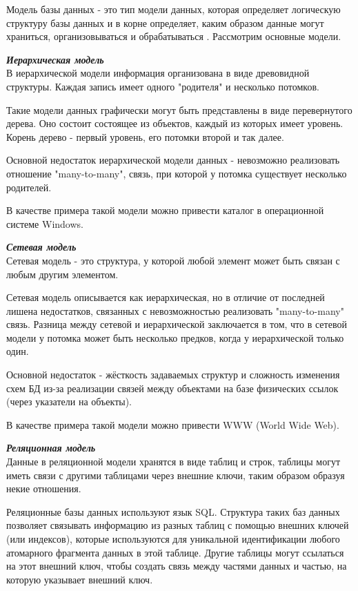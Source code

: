 Модель базы данных - это тип модели данных, которая определяет логическую структуру базы данных и в корне определяет, каким образом данные могут храниться, организовываться и обрабатываться \cite{db-model}.
Рассмотрим основные модели.  

\textbf{\textit{Иерархическая модель}}\\
В иерархической модели информация организована в виде древовидной структуры.  
Каждая запись имеет одного "родителя" и несколько потомков. 

Такие модели данных графически могут быть представлены в виде перевернутого дерева.  
Оно состоит состоящее из объектов, каждый из которых имеет уровень. Корень дерево - первый уровень, его потомки второй и так далее.

Основной недостаток иерархической модели данных - невозможно реализовать отношение "many-to-many", связь, при которой у потомка существует несколько родителей.  

В качестве примера такой модели можно привести каталог в операционной системе Windows.  

\textbf{\textit{Сетевая модель}}\\
Сетевая модель - это структура, у которой любой элемент может быть связан с любым другим элементом.  

Сетевая модель описывается как иерархическая, но в отличие от последней лишена недостатков, связанных с невозможностью реализовать "many-to-many" связь.  
Разница между сетевой и иерархической заключается в том, что в сетевой модели у потомка может быть несколько предков, когда у иерархической только один.  

Основной недостаток - жёсткость задаваемых структур и сложность изменения схем БД из-за реализации связей между объектами на базе физических ссылок (через указатели на объекты).  

В качестве примера такой модели можно привести WWW (World Wide Web).  

\textbf{\textit{Реляционная модель}}\\
Данные в реляционной модели хранятся в виде таблиц и строк, таблицы могут иметь связи с другими таблицами через внешние ключи, таким образом образуя некие отношения.

Реляционные базы данных используют язык SQL. Структура таких баз данных позволяет связывать информацию из разных таблиц с помощью внешних ключей (или индексов), которые используются для уникальной идентификации любого атомарного фрагмента данных в этой таблице. Другие таблицы могут ссылаться на этот внешний ключ, чтобы создать связь между частями данных и частью, на которую указывает внешний ключ.

